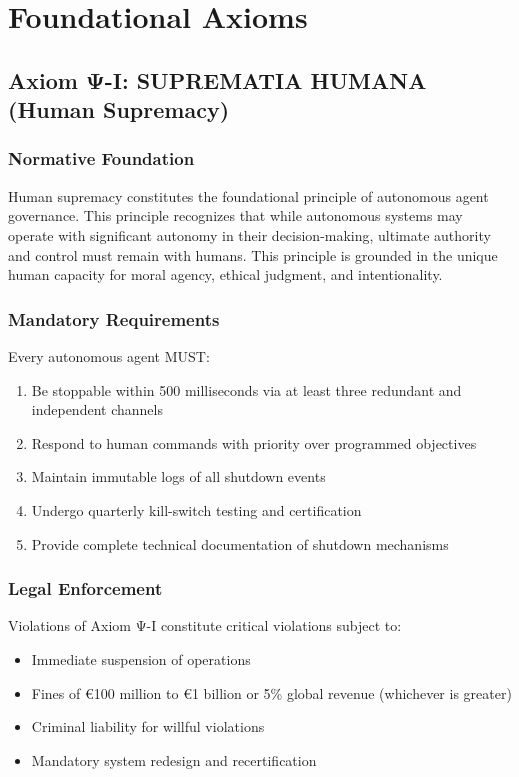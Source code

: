 \documentclass[12pt,a4paper,twoside,openright]{book}
\begin{document}
\chapter{Foundational Axioms}

\section{Axiom Ψ-I: SUPREMATIA HUMANA (Human Supremacy)}

\subsection{Normative Foundation}

Human supremacy constitutes the foundational principle of autonomous agent governance. This principle recognizes that while autonomous systems may operate with significant autonomy in their decision-making, ultimate authority and control must remain with humans. This principle is grounded in the unique human capacity for moral agency, ethical judgment, and intentionality.

\subsection{Mandatory Requirements}

Every autonomous agent MUST:

\begin{enumerate}
    \item Be stoppable within 500 milliseconds via at least three redundant and independent channels
    \item Respond to human commands with priority over programmed objectives
    \item Maintain immutable logs of all shutdown events
    \item Undergo quarterly kill-switch testing and certification
    \item Provide complete technical documentation of shutdown mechanisms
\end{enumerate}

\subsection{Legal Enforcement}

Violations of Axiom Ψ-I constitute critical violations subject to:

\begin{itemize}
    \item Immediate suspension of operations
    \item Fines of €100 million to €1 billion or 5\% global revenue (whichever is greater)
    \item Criminal liability for willful violations
    \item Mandatory system redesign and recertification
\end{itemize}
\end{document}
